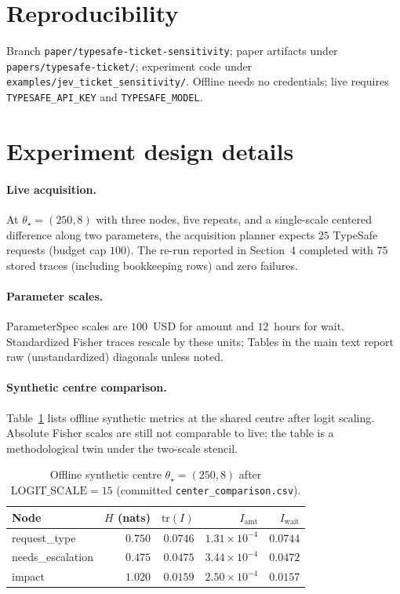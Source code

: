 \documentclass[11pt,a4paper]{article}
\begin{document}
\section*{Reproducibility}

Branch \texttt{paper/typesafe-ticket-sensitivity}; paper artifacts under
\texttt{papers/typesafe-ticket/}; experiment code under
\texttt{examples/jev\_ticket\_sensitivity/}. Offline needs no credentials;
live requires \texttt{TYPESAFE\_API\_KEY} and \texttt{TYPESAFE\_MODEL}.



\clearpage
\appendix
\section{Experiment design details}
\label{app:design}

\paragraph{Live acquisition.}
At $\theta_\star=(250,8)$ with three nodes, five repeats, and a single-scale
centered difference along two parameters, the acquisition planner expects
$25$ TypeSafe requests (budget cap $100$). The re-run reported in
Section~4 completed with $75$ stored traces (including bookkeeping rows) and
zero failures.

\paragraph{Parameter scales.}
ParameterSpec scales are $100$~USD for amount and $12$~hours for wait.
Standardized Fisher traces rescale by these units; Tables in the main text
report raw (unstandardized) diagonals unless noted.

\paragraph{Synthetic centre comparison.}
Table~\ref{tab:syncenter} lists offline synthetic metrics at the shared
centre after logit scaling. Absolute Fisher scales are still not comparable to
live; the table is a methodological twin under the two-scale stencil.

\begin{table}[h]
\centering
\caption{Offline synthetic centre $\theta_\star=(250,8)$ after
$\mathrm{LOGIT\_SCALE}{=}15$ (committed \texttt{center\_comparison.csv}).}
\label{tab:syncenter}
\begin{tabular}{lrrrr}
\toprule
Node & $H$ (nats) & $\mathrm{tr}(I)$ & $I_{\mathrm{amt}}$ & $I_{\mathrm{wait}}$ \\
\midrule
request\_type & $0.750$ & $0.0746$ & $1.31{\times}10^{-4}$ & $0.0744$ \\
needs\_escalation & $0.475$ & $0.0475$ & $3.44{\times}10^{-4}$ & $0.0472$ \\
impact & $1.020$ & $0.0159$ & $2.50{\times}10^{-4}$ & $0.0157$ \\
\bottomrule
\end{tabular}
\end{table}
\end{document}
